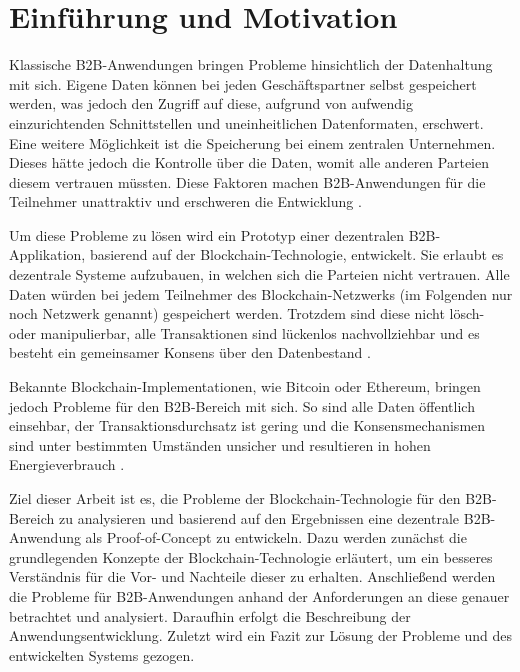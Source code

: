\chapter{Einführung und Motivation}
\label{cha:einfuehrung}

Klassische B2B-Anwendungen bringen Probleme hinsichtlich der Datenhaltung mit sich. Eigene Daten können bei jeden Geschäftspartner selbst gespeichert werden, was jedoch den Zugriff auf diese, aufgrund von aufwendig einzurichtenden Schnittstellen und uneinheitlichen Datenformaten, erschwert. Eine weitere Möglichkeit ist die Speicherung bei einem zentralen Unternehmen. Dieses hätte jedoch die Kontrolle über die Daten, womit alle anderen Parteien diesem vertrauen müssten. Diese Faktoren machen B2B-Anwendungen für die Teilnehmer unattraktiv und erschweren die Entwicklung \cite{KorpelaDigitalSupplyChain2017}\cite{WustyouneedBlockchain2017}.

Um diese Probleme zu lösen wird ein Prototyp einer dezentralen B2B-Applikation, basierend auf der Blockchain-Technologie, entwickelt. Sie erlaubt es dezentrale Systeme aufzubauen, in welchen sich die Parteien nicht vertrauen. Alle Daten würden bei jedem Teilnehmer des Blockchain-Netzwerks (im Folgenden nur noch Netzwerk genannt) gespeichert werden. Trotzdem sind diese nicht lösch- oder manipulierbar, alle Transaktionen sind lückenlos nachvollziehbar und es besteht ein gemeinsamer Konsens über den Datenbestand \cite{CrosbyBlockChainTechnologyBitcoin2016}.

Bekannte Blockchain-Implementationen, wie Bitcoin oder Ethereum, bringen jedoch Probleme für den B2B-Bereich mit sich. So sind alle Daten öffentlich einsehbar, der Transaktionsdurchsatz ist gering und die Konsensmechanismen sind unter bestimmten Umständen unsicher und resultieren in hohen Energieverbrauch \cite{Gramolidangerprivateblockchains2016}\cite{NakamotoBitcoinPeertoPeerElectronic2008}\cite{EthereumTeamEthereumWhitePaper2017}. 

Ziel dieser Arbeit ist es, die Probleme der Blockchain-Technologie für den B2B-Bereich zu analysieren und basierend auf den Ergebnissen eine dezentrale B2B-Anwendung als Proof-of-Concept zu entwickeln. Dazu werden zunächst die grundlegenden Konzepte der Blockchain-Technologie erläutert, um ein besseres Verständnis für die Vor- und Nachteile dieser zu erhalten. Anschließend werden die Probleme für B2B-Anwendungen anhand der Anforderungen an diese genauer betrachtet und analysiert. Daraufhin erfolgt die Beschreibung der Anwendungsentwicklung. Zuletzt wird ein Fazit zur Lösung der Probleme und des entwickelten Systems gezogen.

